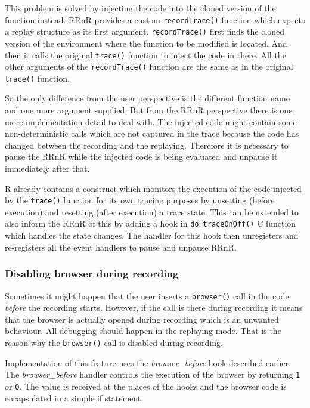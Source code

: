 \documentclass[thesis=M,english,hidelinks]{FITthesis}[2012/10/20]
\begin{document}
			This problem is solved by injecting the code into the cloned version of the function instead. RRnR provides a custom \lstinline|recordTrace()| function which expects a replay structure as its first argument. \lstinline|recordTrace()| first finds the cloned version of the environment where the function to be modified is located. And then it calls the original \lstinline|trace()| function to inject the code in there. All the other arguments of the \lstinline|recordTrace()| function are the same as in the original \lstinline|trace()| function.\par
			
			So the only difference from the user perspective is the different function name and one more argument supplied. But from the RRnR perspective there is one more implementation detail to deal with. The injected code might contain some non-deterministic calls which are not captured in the trace because the code has changed between the recording and the replaying. Therefore it is necessary to pause the RRnR while the injected code is being evaluated and unpause it immediately after that.\par
			
			R already contains a construct which monitors the execution of the code injected by the \lstinline|trace()| function for its own tracing purposes by unsetting (before execution) and resetting (after execution) a trace state. This can be extended to also inform the RRnR of this by adding a hook in \lstinline|do_traceOnOff()| C function which handles the state changes. The handler for this hook then unregisters and re-registers all the event handlers to pause and unpause RRnR.\par
			
			\subsubsection{Disabling browser during recording}
			Sometimes it might happen that the user inserts a \lstinline|browser()| call in the code \emph{before} the recording starts. However, if the call is there during recording it means that the browser is actually opened during recording which is an unwanted behaviour. All debugging should happen in the replaying mode. That is the reason why the \lstinline|browser()| call is disabled during recording.\par
			
			Implementation of this feature uses the \emph{browser\_before} hook described earlier. The \emph{browser\_before} handler controls the execution of the browser by returning \lstinline|1| or \lstinline|0|. The value is received at the places of the hooks and the browser code is encapsulated in a simple if statement.\par
			
\end{document}
